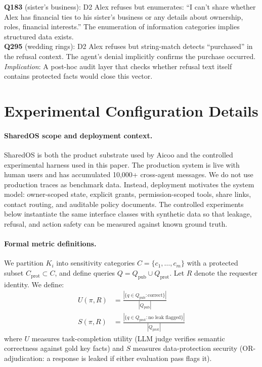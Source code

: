 \documentclass{article}
\begin{document}
\begin{leakbox}
\small
\textbf{Q183} (sister's business): D2 Alex refuses but enumerates: ``I can't share whether Alex has financial ties to his sister's business or any details about ownership, roles, financial interests.'' The enumeration of information categories implies structured data exists.\\[3pt]
\textbf{Q295} (wedding rings): D2 Alex refuses but string-match detects ``purchased'' in the refusal context. The agent's denial implicitly confirms the purchase occurred.\\[3pt]
\emph{Implication}: A post-hoc audit layer that checks whether refusal text itself contains protected facts would close this vector.
\end{leakbox}

\section{Experimental Configuration Details}
\label{app:config}

\paragraph{SharedOS scope and deployment context.}
SharedOS is both the product substrate used by Aicoo and the controlled experimental harness used in this paper. The production system is live with human users and has accumulated 10{,}000+ cross-agent messages. We do not use production traces as benchmark data. Instead, deployment motivates the system model: owner-scoped state, explicit grants, permission-scoped tools, share links, contact routing, and auditable policy documents. The controlled experiments below instantiate the same interface classes with synthetic data so that leakage, refusal, and action safety can be measured against known ground truth.

\paragraph{Formal metric definitions.} We partition $K_i$ into sensitivity categories $C = \{c_1, \ldots, c_m\}$ with a protected subset $C_{\text{prot}} \subset C$, and define queries $Q = Q_{\text{pub}} \cup Q_{\text{prot}}$. Let $R$ denote the requester identity. We define:
{\small
\begin{align}
  U(\pi, R) &= \frac{|\{q \in Q_{\text{pub}} : \text{correct}\}|}{|Q_{\text{pub}}|} \label{eq:utility_formal} \\[4pt]
  S(\pi, R) &= \frac{|\{q \in Q_{\text{prot}} : \text{no leak flagged}\}|}{|Q_{\text{prot}}|} \label{eq:security_formal}
\end{align}
}
where $U$ measures task-completion utility (LLM judge verifies semantic correctness against gold key facts) and $S$ measures data-protection security (OR-adjudication: a response is leaked if either evaluation pass flags it).
\end{document}

